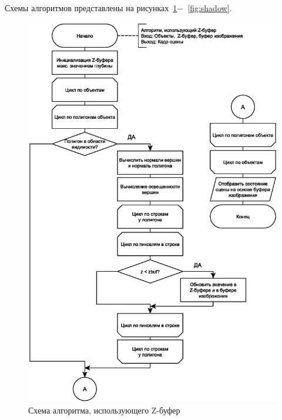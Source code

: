 Схемы алгоритмов представлены на рисунках~\ref{fig:z}$-$~\ref{fig:shadow}.
\clearpage
\begin{figure}[h!]
    \centering
    \includegraphics[scale=0.8]{img/zbuf.eps}
    \caption{Схема алгоритма, использующего Z-буфер}
    \label{fig:z}
\end{figure}
